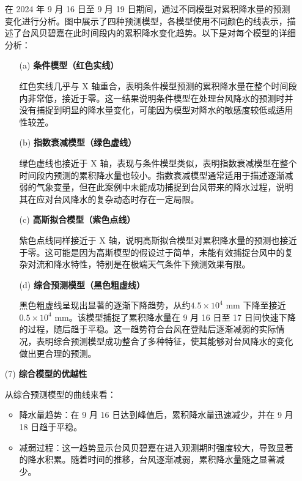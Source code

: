 \documentclass[withoutpreface,bwprint]{cumcmthesis}
\begin{document}
\begin{enumerate}
        在 2024 年 9 月 16 日至 9 月 19 日期间，通过不同模型对累积降水量的预测变化进行分析。图中展示了四种预测模型，各模型使用不同颜色的线表示，描述了台风贝碧嘉在此时间段内的累积降水变化趋势。以下是对每个模型的详细分析：

      \begin{enumerate}
            \item[(a)] \textbf{条件模型（红色实线）}

            红色实线几乎与 X 轴重合，表明条件模型预测的累积降水量在整个时间段内非常低，接近于零。这一结果说明条件模型在处理台风降水的预测时并没有捕捉到明显的降水量变化，可能因为模型对降水的敏感度较低或适用性较差。

            \item[(b)] \textbf{指数衰减模型（绿色虚线）}

            绿色虚线也接近于 X 轴，表现与条件模型类似，表明指数衰减模型在整个时间段内预测的累积降水量也较小。指数衰减模型通常适用于描述逐渐减弱的气象变量，但在此案例中未能成功捕捉到台风带来的降水过程，说明其在应对台风降水的复杂动态时存在一定局限。

            \item[(c)] \textbf{高斯拟合模型（紫色点线）}

            紫色点线同样接近于 X 轴，说明高斯拟合模型对累积降水量的预测也接近于零。这可能是因为高斯模型的假设过于简单，未能有效捕捉台风中的复杂对流和降水特性，特别是在极端天气条件下预测效果有限。

             \item[(d)] \textbf{综合预测模型（黑色粗虚线）}

            黑色粗虚线呈现出显著的逐渐下降趋势，从约$4.5 \times 10^4$ mm 下降至接近 $0.5 \times 10^4$ mm。该模型捕捉了累积降水量在 9 月 16 日至 17 日间快速下降的过程，随后趋于平稳。这一趋势符合台风在登陆后逐渐减弱的实际情况，表明综合预测模型成功整合了多种特征，使其能够对台风降水的变化做出更合理的预测。           
        \end{enumerate}

    \vspace{1em}
    \item[(7)] \textbf{综合模型的优越性} 

    从综合预测模型的曲线来看：

    \begin{itemize}
        \item 降水量趋势：在 9 月 16 日达到峰值后，累积降水量迅速减少，并在 9 月 18 日趋于平稳。

        \item 减弱过程：这一趋势显示台风贝碧嘉在进入观测期时强度较大，导致显著的降水积累。随着时间的推移，台风逐渐减弱，累积降水量随之显著减少。
    \end{itemize}
    
\end{enumerate}
\end{document}
